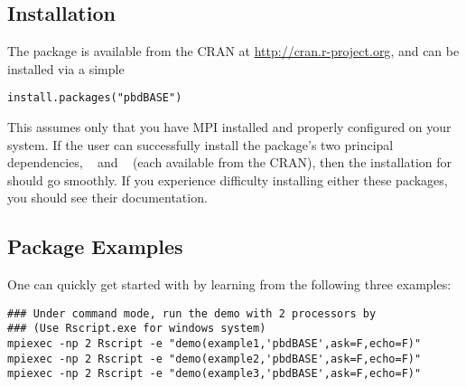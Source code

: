 \subsection[]{Installation}
\label{sec:installation}

The  package is available from the CRAN at
\url{http://cran.r-project.org}, and can be installed via a simple 
\begin{lstlisting}[language=rr,title=Installing pbdBASE]
install.packages("pbdBASE")
\end{lstlisting}
This assumes only that you have MPI installed and properly configured on your system.  If the user can successfully install the package's two principal dependencies, ~\citep{Chen2012pbdMPIpackage} and ~\citep{Chen2012pbdSLAPpackage} (each available from the CRAN), then the installation for  should go smoothly.  If you experience difficulty installing either these packages, you should see their documentation.

\subsection[]{Package Examples}
\label{sec:more_examples}

One can quickly get started with  by learning from the following three examples:
\begin{lstlisting}
### Under command mode, run the demo with 2 processors by
### (Use Rscript.exe for windows system)
mpiexec -np 2 Rscript -e "demo(example1,'pbdBASE',ask=F,echo=F)"
mpiexec -np 2 Rscript -e "demo(example2,'pbdBASE',ask=F,echo=F)"
mpiexec -np 2 Rscript -e "demo(example3,'pbdBASE',ask=F,echo=F)"
\end{lstlisting}
% 

